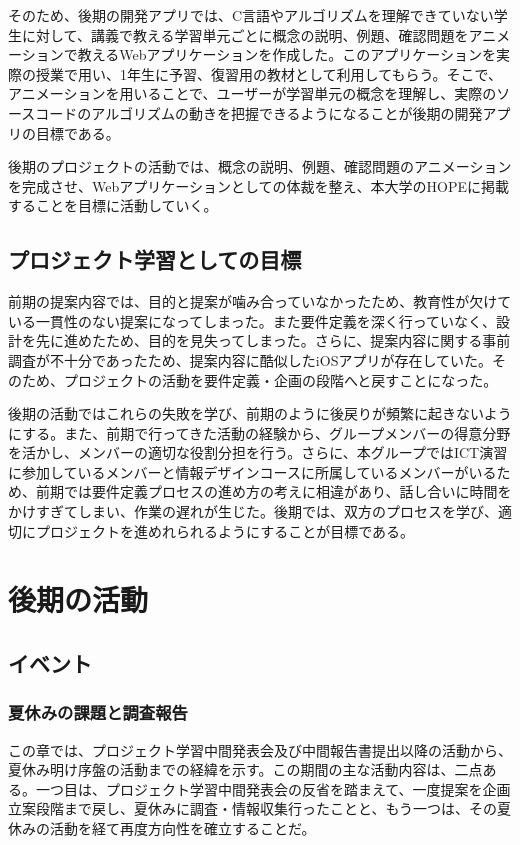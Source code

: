 \documentclass[openany,11pt,papersize]{jsbook}
\begin{document}
\par
そのため、後期の開発アプリでは、C言語やアルゴリズムを理解できていない学生に対して、講義で教える学習単元ごとに概念の説明、例題、確認問題をアニメーションで教えるWebアプリケーションを作成した。このアプリケーションを実際の授業で用い、1年生に予習、復習用の教材として利用してもらう。そこで、アニメーションを用いることで、ユーザーが学習単元の概念を理解し、実際のソースコードのアルゴリズムの動きを把握できるようになることが後期の開発アプリの目標である。
\par
後期のプロジェクトの活動では、概念の説明、例題、確認問題のアニメーションを完成させ、Webアプリケーションとしての体裁を整え、本大学のHOPEに掲載することを目標に活動していく。

\section{プロジェクト学習としての目標}
前期の提案内容では、目的と提案が噛み合っていなかったため、教育性が欠けている一貫性のない提案になってしまった。また要件定義を深く行っていなく、設計を先に進めたため、目的を見失ってしまった。さらに、提案内容に関する事前調査が不十分であったため、提案内容に酷似したiOSアプリが存在していた。そのため、プロジェクトの活動を要件定義・企画の段階へと戻すことになった。
\par
後期の活動ではこれらの失敗を学び、前期のように後戻りが頻繁に起きないようにする。また、前期で行ってきた活動の経験から、グループメンバーの得意分野を活かし、メンバーの適切な役割分担を行う。さらに、本グループではICT演習に参加しているメンバーと情報デザインコースに所属しているメンバーがいるため、前期では要件定義プロセスの進め方の考えに相違があり、話し合いに時間をかけすぎてしまい、作業の遅れが生じた。後期では、双方のプロセスを学び、適切にプロジェクトを進めれられるようにすることが目標である。



\chapter{後期の活動}


\section{イベント}

\subsection{夏休みの課題と調査報告}
この章では、プロジェクト学習中間発表会及び中間報告書提出以降の活動から、夏休み明け序盤の活動までの経緯を示す。この期間の主な活動内容は、二点ある。一つ目は、プロジェクト学習中間発表会の反省を踏まえて、一度提案を企画立案段階まで戻し、夏休みに調査・情報収集行ったことと、もう一つは、その夏休みの活動を経て再度方向性を確立することだ。
\end{document}
